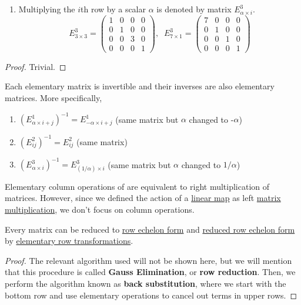 \begin{lemma}
\begin{enumerate}
			\item Multiplying the $i$th row by a scalar $\alpha$ is denoted by matrix $E^3_{\alpha \times i}$. 
			\begin{equation}
				E^3_{3 \times 3} = \begin{pmatrix}
				1&0&0&0 \\ 0&1&0&0 \\ 0&0&3&0 \\ 0&0&0&1
				\end{pmatrix}, \;\; E^3_{7 \times 1} = \begin{pmatrix}
				7&0&0&0 \\ 0&1&0&0 \\ 0&0&1&0 \\ 0&0&0&1
				\end{pmatrix}
			\end{equation}
		\end{enumerate}
	\end{lemma}
	\begin{proof}
	  Trivial. 
	\end{proof}

	\begin{lemma}
	  \label{thm:inverse-of-elementary-row-transformations}
    Each elementary matrix is invertible and their inverses are also elementary matrices. More specifically, 
    \begin{enumerate}
      \item $(E^1_{\alpha \times i + j})^{-1} = E^1_{-\alpha \times i + j}$ (same matrix but $\alpha$ changed to -$\alpha$)
      \item $(E^2_{i j})^{-1} = E^2_{i j}$ (same matrix) 
      \item $(E^3_{\alpha \times i})^{-1} = E^{3}_{(1/\alpha) \times i}$ (same matrix but $\alpha$ changed to $1 / \alpha$)
    \end{enumerate}
  \end{lemma}

  Elementary column operations of are equivalent to right multiplication of matrices. However, since we defined the action of a \hyperref[def:linear_map]{linear map} as left \hyperref[def:matrix-multiplication]{matrix multiplication}, we don't focus on column operations. 

	\begin{theorem}
	  \label{thm:gauss-jordan-elimination}
    Every matrix can be reduced to \hyperref[def:row-echelon-form]{row echelon form} and \hyperref[def:reduced-row-echelon-form]{reduced row echelon form} by \hyperref[def:elementary-row-transformation]{elementary row transformations}. 
  \end{theorem}
  \begin{proof}
    The relevant algorithm used will not be shown here, but we will mention that this procedure is called \textbf{Gauss Elimination}, or \textbf{row reduction}. Then, we perform the algorithm known as \textbf{back substitution}, where we start with the bottom row and use elementary operations to cancel out terms in upper rows. 
  \end{proof}

